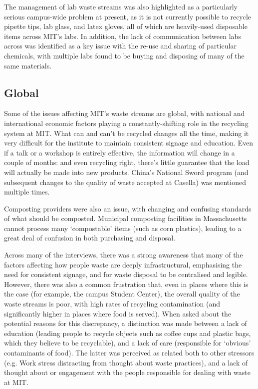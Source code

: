 \documentclass[nofonts,nols,justified,nobib]{tufte-book}
\begin{document}

The management of lab waste streams was also highlighted as a particularly serious campus-wide problem at present, as it is not currently possible to recycle pipette tips, lab glass, and latex gloves, all of which are heavily-used disposable items across MIT's labs. In addition, the lack of communication between labs across was identified as a key issue with the re-use and sharing of particular chemicals, with multiple labs found to be buying and disposing of many of the same materials. 


\subsection*{Global}

Some of the issues affecting MIT's waste streams are global, with national and international economic factors playing a constantly-shifting role in the recycling system at MIT. What can and can't be recycled changes all the time, making it very difficult for the institute to maintain consistent signage and education. Even if a talk or a workshop is entirely effective, the information will change in a couple of months: and even recycling right, there's little guarantee that the load will actually be made into new products. China's National Sword program (and subsequent changes to the quality of waste accepted at Casella) was mentioned multiple times.

Composting providers were also an issue, with changing and confusing standards of what should be composted. Municipal composting facilities in Massachusetts cannot process many `compostable' items (such as corn plastics), leading to a great deal of confusion in both purchasing and disposal. 

Across many of the interviews, there was a strong awareness that many of the factors affecting how people waste are deeply infrastructural, emphasising the need for consistent signage, and for waste disposal to be centralised and legible. However, there was also a common frustration that, even in places where this is the case (for example, the campus Student Center), the overall quality of the waste streams is poor, with high rates of recycling contamination (and significantly higher in places where food is served). When asked about the potential reasons for this discrepancy, a distinction was made between a lack of education (leading people to recycle objects such as coffee cups and plastic bags, which they believe to be recyclable), and a lack of care (responsible for `obvious' contaminants of food). The latter was perceived as related both to other stressors (e.g. Work stress distracting from thought about waste practices), and a lack of thought about or engagement with the people responsible for dealing with waste at MIT.
\end{document}
